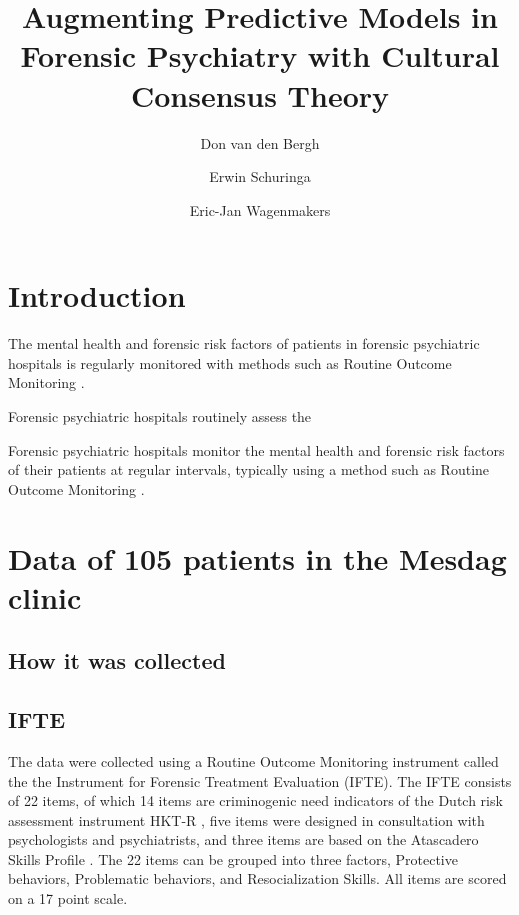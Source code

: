 \documentclass[a4paper,11pt]{article}
\title{Augmenting Predictive Models in Forensic Psychiatry with Cultural Consensus Theory}
\author[1]{Don van den Bergh}
\author[2]{Erwin Schuringa}
\author[1]{Eric-Jan Wagenmakers}
\affil[1]{Department of Psychological Methods, University of Amsterdam}
\affil[2]{Forensic Psychiatric Centre Dr. S. van Mesdag}
\date{}
\begin{document}
\maketitle

\tableofcontents

\begin{abstract}
	
\end{abstract}

\section{Introduction}
The mental health and forensic risk factors of patients in forensic psychiatric hospitals is regularly monitored with methods such as
Routine Outcome Monitoring \parencite{deBeurs2011ROM}.

Forensic psychiatric hospitals routinely assess the 

Forensic psychiatric hospitals monitor the mental health and forensic risk factors of their patients at regular intervals, typically using a method such as Routine Outcome Monitoring \parencite{deBeurs2011ROM}.

\section{Data of 105 patients in the Mesdag clinic}
\subsection{How it was collected}
\subsection{IFTE}

The data were collected using a Routine Outcome Monitoring instrument called the the Instrument for Forensic Treatment Evaluation (IFTE).
The IFTE consists of 22 items, of which 14 items are criminogenic need indicators of the Dutch risk assessment instrument HKT-R \parencite{spreen2013handleiding}, five items were designed in consultation with psychologists and psychiatrists, and three items are based on the Atascadero Skills Profile \parencite{vess2001development}.
The 22 items can be grouped into three factors, Protective behaviors, Problematic behaviors, and Resocialization Skills.
All items are scored on a 17 point scale.
\end{document}

